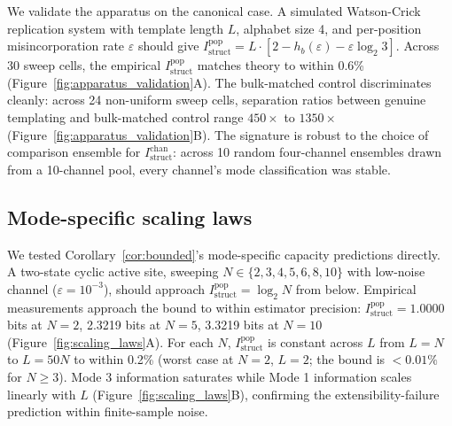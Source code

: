 \documentclass[aps,prx,reprint,amsmath,amssymb,floatfix,superscriptaddress,nofootinbib]{revtex4-2}
\theoremstyle{plain-thm}
\theoremstyle{definition-thm}
\newcommand{\Istructpop}{I_{\mathrm{struct}}^{\mathrm{pop}}}
\newcommand{\Istructchan}{I_{\mathrm{struct}}^{\mathrm{chan}}}
\newcommand{\Hbin}{h_b}
\begin{document}
We validate the apparatus on the canonical case. A simulated Watson-Crick replication system with template length $L$, alphabet size 4, and per-position misincorporation rate $\varepsilon$ should give $\Istructpop = L \cdot \left[2 - \Hbin(\varepsilon) - \varepsilon \log_2 3\right]$. Across 30 sweep cells, the empirical $\Istructpop$ matches theory to within 0.6\% (Figure~\ref{fig:apparatus_validation}A). The bulk-matched control discriminates cleanly: across 24 non-uniform sweep cells, separation ratios between genuine templating and bulk-matched control range $450\times$ to $1350\times$ (Figure~\ref{fig:apparatus_validation}B). The signature is robust to the choice of comparison ensemble for $\Istructchan$: across 10 random four-channel ensembles drawn from a 10-channel pool, every channel's mode classification was stable.

\subsection{Mode-specific scaling laws}

We tested Corollary~\ref{cor:bounded}'s mode-specific capacity predictions directly. A two-state cyclic active site, sweeping $N \in \{2, 3, 4, 5, 6, 8, 10\}$ with low-noise channel ($\varepsilon = 10^{-3}$), should approach $\Istructpop = \log_2 N$ from below. Empirical measurements approach the bound to within estimator precision: $\Istructpop = 1.0000$ bits at $N = 2$, 2.3219 bits at $N = 5$, 3.3219 bits at $N = 10$ (Figure~\ref{fig:scaling_laws}A). For each $N$, $\Istructpop$ is constant across $L$ from $L = N$ to $L = 50N$ to within 0.2\% (worst case at $N = 2$, $L = 2$; the bound is $< 0.01\%$ for $N \ge 3$). Mode 3 information saturates while Mode 1 information scales linearly with $L$ (Figure~\ref{fig:scaling_laws}B), confirming the extensibility-failure prediction within finite-sample noise.
\end{document}
